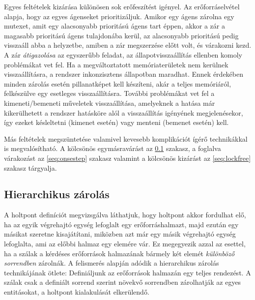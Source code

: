    Egyes feltételek kizárása különösen sok erőfeszítést igényel. Az erőforráselvétel alapja, hogy az egyes ágenseket prioritizáljuk. Amikor egy ágens zárolna egy mutexet, amit egy alacsonyabb prioritású ágens tart éppen, akkor a zár a magasabb prioritású ágens tulajdonába kerül, az alacsonyabb prioritású pedig visszaáll abba a helyzetbe, amiben a zár megszerzése előtt volt, és várakozni kezd. A zár \emph{átigazolása} az egyszerűbb feladat, az állapotvisszaállítás ellenben komoly problémákat vet fel. Ha a megváltoztatott memóriaterületek nem kerülnek visszaállításra, a rendszer inkonzisztens állapotban maradhat. Ennek érdekében minden zárolás esetén pillanatképet kell készíteni, akár a teljes memóriáról, felkészülve egy esetleges visszaállításra. További problémákat vet fel a kimeneti/bemeneti műveletek visszaállítása, amelyeknek a hatása már kikerülhetett a rendszer hatásköre alól a visszaállítás igényének megjelenésekor, így ezeket késleltetni (kimenet esetén) vagy menteni (bemenet esetén) kell.
    
    Más feltételek megszüntetése valamivel kevesebb komplikációt ígérő technikákkal is megvalósítható. A kölcsönös egymásravárást az \ref{seq:hierarchical} szakasz, a foglalva várakozást az \ref{seq:onsestep} szakasz valamint a kölcsönös kizárást az \ref{seq:lockfree} szakasz tárgyalja.


    \subsection{Hierarchikus zárolás} 
    \label{seq:hierarchical}
    A holtpont definíciót megvizsgálva láthatjuk, hogy holtpont akkor fordulhat elő, ha az egyik végrehajtó egység lefoglalt egy erőforráshalmazt, majd ezután egy másikat szeretne kisajátítani, miközben azt már egy másik végrehajtó egység lefoglalta, ami az előbbi halmaz egy elemére vár. Ez megegyezik azzal az esettel, ha a szálak a kérdéses erőforrások halmazának bármely két elemét \emph{különböző sorrendben} zárolnák. A felismerés alapján adódik a hierarchikus zárolás technikájának ötlete: Definiáljunk az erőforrások halmazán egy teljes rendezést. A szálak csak a definiált sorrend szerint növekvő sorrendben zárolhatják az egyes entitásokat, a holtpont kialakulását elkerülendő. 
    
